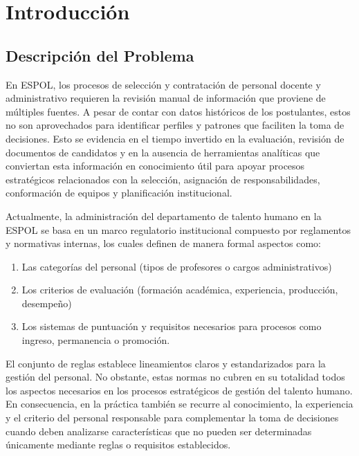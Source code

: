 \chapter{Introducción}

    \section{Descripción del Problema}
        En ESPOL, los procesos de selección y contratación de personal docente y administrativo requieren la revisión manual de información que proviene de múltiples fuentes. A pesar de contar con datos históricos de los postulantes, estos no son aprovechados para identificar perfiles y patrones que faciliten la toma de decisiones. Esto se evidencia en el tiempo invertido en la evaluación, revisión de documentos de candidatos y en la ausencia de herramientas analíticas que conviertan esta información en conocimiento útil para apoyar procesos estratégicos relacionados con la selección, asignación de responsabilidades, conformación de equipos y planificación institucional.

        Actualmente, la administración del departamento de talento humano en la ESPOL se basa en un marco regulatorio institucional compuesto por reglamentos y normativas internas, los cuales definen de manera formal aspectos como:

        \begin{enumerate}
                \item Las categorías del personal (tipos de profesores o cargos administrativos)
                \item Los criterios de evaluación (formación académica, experiencia, producción, desempeño)
                \item Los sistemas de puntuación y requisitos necesarios para procesos como ingreso, permanencia o promoción.
            \end{enumerate}
        
        El conjunto de reglas establece lineamientos claros y estandarizados para la gestión del personal. No obstante, estas normas no cubren en su totalidad todos los aspectos necesarios en los procesos estratégicos de gestión del talento humano. En consecuencia, en la práctica también se recurre al conocimiento, la experiencia y el criterio del personal responsable para complementar la toma de decisiones cuando deben analizarse características que no pueden ser determinadas únicamente mediante reglas o requisitos establecidos. 
        
